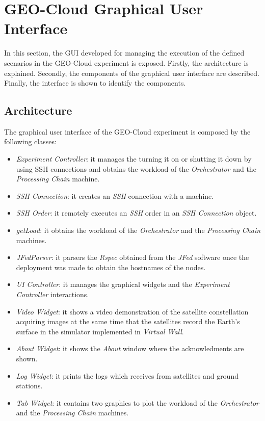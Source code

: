 \section{GEO-Cloud Graphical User Interface}
\label{sec:interfaz}
In this section, the \ac{GUI} developed for managing the execution of the defined
scenarios in the GEO-Cloud experiment is exposed. Firstly, the architecture is
explained. Secondly, the components of the graphical user interface are described. Finally, the interface is shown to identify the components.

\subsection{Architecture}

The graphical user interface of the GEO-Cloud experiment is composed by the following classes:

\begin{itemize}

\item \emph{Experiment Controller}: it manages the \sss turning it on or shutting it down by using \ac{SSH} connections and obtains the workload of the \emph{Orchestrator} and the \emph{Processing Chain} machine.
\item \emph{SSH Connection}: it creates an \emph{SSH} connection with a \vw machine.
\item \emph{SSH Order}: it remotely executes an  \emph{SSH} order in an \emph{SSH Connection} object.
\item \emph{getLoad}: it obtains the workload of the \emph{Orchestrator} and the \emph{Processing Chain} machines.
\item \emph{JFedParser}: it parsers the \emph{Rspec} obtained from the \emph{JFed} software once the \vw deployment was made to obtain the hostnames of the \vw nodes.
\item \emph{UI Controller}: it manages the graphical widgets and the \emph{Experiment Controller} interactions.
\item \emph{Video Widget}: it shows a video demonstration of the satellite constellation acquiring images at the same time that the satellites record the Earth's surface in the simulator implemented in \emph{Virtual Wall}.
\item \emph{About Widget}: it shows the \emph{About} window where the acknowledments are shown.
\item \emph{Log Widget}: it prints the logs which receives from satellites and ground stations.
\item \emph{Tab Widget}: it contains two graphics to plot the workload of the \emph{Orchestrator} and the \emph{Processing Chain} machines.
\end{itemize}

